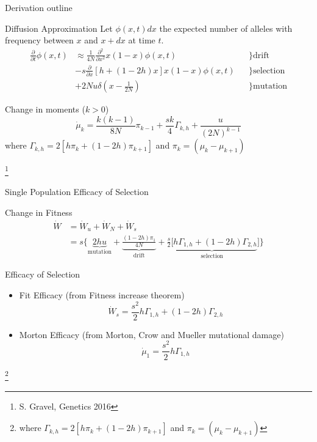 \documentclass[10pt]{beamer}
\newcommand{\del}[1]{\ensuremath{\frac{\partial}{\partial #1}}}
\newcommand{\dell}[1]{\ensuremath{\frac{\partial^2}{\partial #1^2}}}
\begin{document}
\begin{frame}{Derivation outline}
  \begin{alertblock}{Diffusion Approximation}
    Let $\phi(x,t)dx$ the expected number of alleles with frequency between $x$
    and $x + dx$ at time $t$.
    \begin{align}
      \del t \phi(x,t) & \approx \frac{1}{4N} \dell x x(1-x) \phi(x,t) 
      & &\bigg\} \mathrm{drift}
      \nonumber \\ 
      &- s \del x [h + ( 1 - 2h)x]x(1-x) \phi(x,t) 
      & &\bigg\} \mathrm{selection}
      \nonumber \\
      &+ 2Nu\delta\left(x - \frac{1}{2N}\right)
      & &\bigg\} \mathrm{mutation}
    \end{align}
  \end{alertblock}
  \begin{block}{Change in moments ($ k > 0$)}
    \[
      \dot \mu_k = \frac{k(k-1)}{8N} \pi_{k-1} + 
        \frac{sk}{4} \Gamma_{k,h} +
        \frac{u}{(2N)^{k-1}}
    \]
    where $\Gamma_{k,h} = 2[h\pi_k + (1 - 2h) \pi_{k+1}]$ and $\pi_k=(\mu_k - \mu_{k + 1})$
  \end{block}
  \let\thefootnote\relax\footnote{S. Gravel, Genetics 2016}
\end{frame}

\begin{frame}{Single Population Efficacy of Selection}
  \begin{block}{Change in Fitness}
  \begin{align}
    \dot W &= \dot W_u + \dot W_N + \dot W_s
    \nonumber \\
    &= s \big\{
    \underbrace{2hu}_\text{mutation} + 
    \underbrace{\frac{(1 - 2h)\pi_1}{4N}}_\text{drift} + 
    \underbrace{\frac{s}{2}[h\Gamma_{1,h}+(1-2h)\Gamma_{2,h}}_\text{selection}]
      \big\}
  \end{align}
  \end{block}
  \begin{alertblock}{Efficacy of Selection}
  \begin{itemize}
    \item Fit Efficacy (from Fitness increase theorem)
    \[ 
      \dot W_s = \frac{s^2}{2}h\Gamma_{1,h}+(1-2h)\Gamma_{2,h}
    \]

  \item Morton Efficacy (from Morton, Crow and Mueller mutational damage)
    \[ 
      \dot \mu_1 = \frac{s^2}{2}h\Gamma_{1,h}
    \]
  \end{itemize}
  \end{alertblock}

  \let\thefootnote\relax\footnote{where $\Gamma_{k,h} = 2[h\pi_k + (1 - 2h) \pi_{k+1}]$ and $\pi_k=(\mu_k - \mu_{k + 1})$}
\end{frame}
\end{document}
